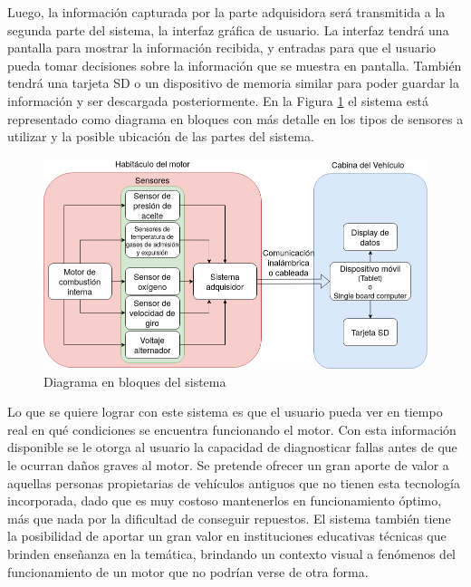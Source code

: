 \documentclass[11pt]{charter}
\begin{document}
Luego, la información capturada por la parte adquisidora será transmitida a la segunda parte del sistema, la interfaz gráfica de usuario. La interfaz tendrá una pantalla para mostrar la información recibida, y entradas para que el usuario pueda tomar decisiones sobre la información que se muestra en pantalla. También tendrá una tarjeta SD o un dispositivo de memoria similar para poder guardar la información y ser descargada posteriormente. En la Figura \ref{fig:diagrama_de_bloques} el sistema está representado como diagrama en bloques con más detalle en los tipos de sensores a utilizar y la posible ubicación de las partes del sistema.

\vspace{25px}

\begin{figure}[htpb]
\centering 
\includegraphics[width=.9\textwidth]{./Figuras/diagrama-proyecto.png}
\caption{Diagrama en bloques del sistema}
\label{fig:diagrama_de_bloques}
\end{figure}

\vspace{25px}

Lo que se quiere lograr con este sistema es que el usuario pueda ver en tiempo real en qué condiciones se encuentra funcionando el motor. Con esta información disponible se le otorga al usuario la capacidad de diagnosticar fallas antes de que le ocurran daños graves al motor. Se pretende ofrecer un gran aporte de valor a aquellas personas propietarias de vehículos antiguos que no tienen esta tecnología incorporada, dado que es muy costoso mantenerlos en funcionamiento óptimo, más que nada por la dificultad de conseguir repuestos. El sistema también tiene la posibilidad de aportar un gran valor en instituciones educativas técnicas que brinden enseñanza en la temática, brindando un contexto visual a fenómenos del funcionamiento de un motor que no podrían verse de otra forma.
\end{document}
